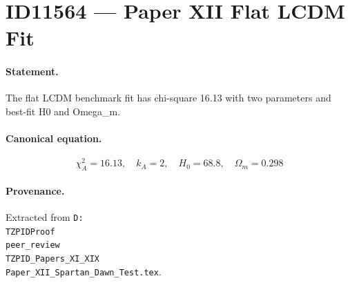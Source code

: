 \section*{ID11564 --- Paper XII Flat LCDM Fit}

\paragraph{Statement.}
The flat LCDM benchmark fit has chi-square 16.13 with two parameters and best-fit H0 and Omega_m.

\paragraph{Canonical equation.}
\[
\chi^2_A=16.13,\quad k_A=2,\quad H_0=68.8,\quad\Omega_m=0.298
\]

\paragraph{Provenance.}
Extracted from \texttt{D:\\TZPIDProof\\peer\_review\\TZPID\_Papers\_XI\_XIX\\Paper\_XII\_Spartan\_Dawn\_Test.tex}.
